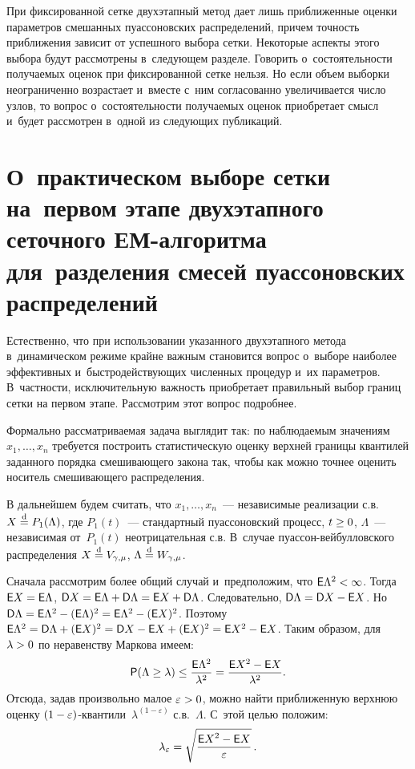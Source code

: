 \begin{multicols}{2}
При фиксированной сетке двухэтапный метод дает лишь приближенные
оценки параметров смешанных пуассоновских распределений, причем
точность приближения зависит от успешного выбора сетки. Некоторые
аспекты этого выбора будут рассмотрены в~следующем разделе. Говорить
о~состоятельности получаемых оценок при фиксированной сетке нельзя.
Но если объем выборки неограниченно возрастает и~вместе с~ним
согласованно увеличивается число узлов, то вопрос о~состоятельности
получаемых оценок приобретает смысл и~будет рассмотрен в~одной из
следующих публикаций.

\section{О~практическом выборе сетки на~первом этапе двухэтапного
сеточного ЕМ-алгоритма для~разделения смесей пуас\-со\-нов\-ских
распределений}

Естественно, что при использовании указанного двухэтапного метода 
в~динамическом режиме крайне важным становится вопрос о~выборе
наиболее эффективных и~быстродействующих численных процедур и~их
параметров. В~част\-ности, исключительную важность приобретает
правильный выбор границ сетки на первом этапе. Рас\-смот\-рим этот
вопрос подробнее.

Формально рассматриваемая задача выглядит так: по наблюдаемым
значениям $x_1,\ldots,x_n$ требуется построить статистическую оценку
верхней границы квантилей заданного порядка сме\-ши\-ва\-юще\-го закона так,
чтобы как можно точнее оценить носитель смешивающего распределения.

В дальнейшем будем считать, что $x_1,\ldots,x_n$~--- независимые
реализации с.в.\  $X\hm\eqd P_1(\Lambda)$, где $P_1(t)$~--- стандартный
пуассоновский процесс, $t\hm\ge0$, $\Lambda$~--- независимая от~$P_1(t)$
неотрицательная с.в. В~случае пу\-ас\-сон-вей\-бул\-лов\-ско\-го распределения
$X\hm\eqd V_{\gamma,\mu}$, $\Lambda\hm\eqd W_{\gamma,\mu}$.

Сначала рассмотрим более общий случай и~предположим, что ${\sf E}
\Lambda^2\hm<\infty$. Тогда ${\sf E}X\hm={\sf E}\Lambda$, ${\sf D}X\hm=
{\sf E}\Lambda\hm+{\sf D}\Lambda\hm={\sf E}X\hm+{\sf D}\Lambda$. Следовательно,
${\sf D}\Lambda\hm={\sf D}X\hm-{\sf E}X$. Но ${\sf D}\Lambda\hm={\sf E}
\Lambda^2\hm-({\sf E}\Lambda)^2\hm={\sf E}\Lambda^2\hm-({\sf E}X)^2$.
Поэтому ${\sf E}\Lambda^2\hm={\sf D}\Lambda\hm+({\sf E}X)^2\hm={\sf D}X\hm-
{\sf E}X\hm+({\sf E}X)^2\hm={\sf E}X^2\hm-{\sf E}X$. Таким образом, для
$\lambda\hm>0$ по неравенству Маркова имеем:
\begin{equation}
{\sf P}(\Lambda\ge\lambda)\le\frac{{\sf
E}\Lambda^2}{\lambda^2}=\frac{{\sf E}X^2-{\sf
E}X}{\lambda^2}.\label{e4-kk}
\end{equation}
Отсюда, задав произвольно малое $\varepsilon\hm>0$, можно \mbox{найти}
приближенную верхнюю оценку 
$(1\hm-\varepsilon)$-кван\-ти\-ли~$\lambda^{(1-\varepsilon)}$ 
с.в.~$\Lambda$. С~этой целью положим:
$$
\lambda_{\varepsilon}=\sqrt{\displaystyle\frac{\displaystyle {\sf E}X^2-{\sf E}X\mathstrut}{\displaystyle \varepsilon\mathstrut}}\,.
$$


\end{multicols}

